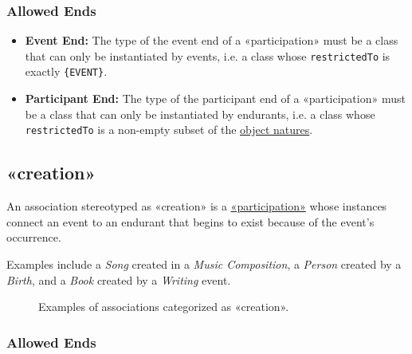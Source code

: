 \subsubsection{Allowed Ends}

\begin{itemize}
    \item \textbf{Event End:} The type of the event end of a «participation» must be a class that can only be instantiated by events, i.e. a class whose \texttt{restrictedTo} is exactly \texttt{\{EVENT\}}.
    \item \textbf{Participant End:} The type of the participant end of a «participation» must be a class that can only be instantiated by endurants, i.e. a class whose \texttt{restrictedTo} is a non-empty subset of the \hyperref[par:object-nature]{object natures}.
\end{itemize}




\subsection{«creation»}
\label{stereotype:creation}

An association stereotyped as «creation» is a \hyperref[stereotype:participation]{«participation»} whose instances connect an event to an endurant that begins to exist because of the event's occurrence.

Examples include a \textit{Song} created in a \textit{Music Composition}, a \textit{Person} created by a \textit{Birth}, and a \textit{Book} created by a \textit{Writing} event.

\begin{figure}[h]
    \centering
    
    \caption{Examples of associations categorized as «creation».}
    \label{fig:creation-example}
\end{figure}

\subsubsection{Allowed Ends}


